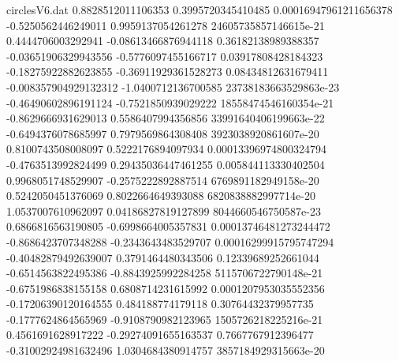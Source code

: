 \begin{filecontents}{circlesV6.dat}
0.8828512011106353	0.3995720345410485	0.00016947961211656378
-0.5250562446249011	0.9959137054261278	24605735857146615e-21
0.4444706003292941	-0.08613466876944118	0.36182138989388357
-0.03651906329943556	-0.5776097455166717	0.03917808428184323
-0.18275922882623855	-0.36911929361528273	0.08434812631679411
-0.008357904929132312	-1.0400712136700585	23738183663529863e-23
-0.46490602896191124	-0.7521850939029222	18558474546160354e-21
-0.8629666931629013	0.5586407994356856	33991640406199663e-22
-0.6494376078685997	0.7979569864308408	3923038920861607e-20
0.8100743508008097	0.5222176894097934	0.00013396974800324794
-0.4763513992824499	0.29435036447461255	0.005844113330402504
0.9968051748529907	-0.2575222892887514	6769891182949158e-20
0.5242050451376069	0.8022664649393088	6820838882997714e-20
1.0537007610962097	0.04186827819127899	8044660546750587e-23
0.6866816563190805	-0.6998664005357831	0.00013746481273244472
-0.8686423707348288	-0.2343643483529707	0.00016299915795747294
-0.40482879492639007	0.3791464480343506	0.12339689252661044
-0.6514563822495386	-0.8843925992284258	5115706722790148e-21
-0.6751986838155158	0.6808714231615992	0.0001207953035552356
-0.17206390120164555	0.484188774179118	0.30764432379957735
-0.1777624864565969	-0.9108790982123965	1505726218225216e-21
0.4561691628917222	-0.29274091655163537	0.7667767912396477
-0.31002924981632496	1.0304684380914757	3857184929315663e-20
\end{filecontents}
